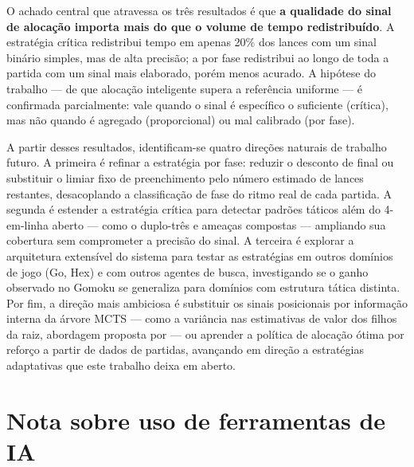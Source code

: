 \documentclass[cic,tc]{iiufrgs}
\begin{document}
O achado central que atravessa os três resultados é que \textbf{a qualidade do sinal de alocação importa mais do que o volume de tempo redistribuído}. A estratégia crítica redistribui tempo em apenas 20\% dos lances com um sinal binário simples, mas de alta precisão; a por fase redistribui ao longo de toda a partida com um sinal mais elaborado, porém menos acurado. A hipótese do trabalho — de que alocação inteligente supera a referência uniforme — é confirmada parcialmente: vale quando o sinal é específico o suficiente (crítica), mas não quando é agregado (proporcional) ou mal calibrado (por fase).

A partir desses resultados, identificam-se quatro direções naturais de trabalho futuro. A primeira é refinar a estratégia por fase: reduzir o desconto de final ou substituir o limiar fixo de preenchimento pelo número estimado de lances restantes, desacoplando a classificação de fase do ritmo real de cada partida. A segunda é estender a estratégia crítica para detectar padrões táticos além do 4-em-linha aberto — como o duplo-três e ameaças compostas — ampliando sua cobertura sem comprometer a precisão do sinal. A terceira é explorar a arquitetura extensível do sistema para testar as estratégias em outros domínios de jogo (Go, Hex) e com outros agentes de busca, investigando se o ganho observado no Gomoku se generaliza para domínios com estrutura tática distinta. Por fim, a direção mais ambiciosa é substituir os sinais posicionais por informação interna da árvore MCTS — como a variância nas estimativas de valor dos filhos da raiz, abordagem proposta por \citet{huang2010time} — ou aprender a política de alocação ótima por reforço a partir de dados de partidas, avançando em direção a estratégias adaptativas que este trabalho deixa em aberto.

% 





\chapter*{Nota sobre uso de ferramentas de IA}
\end{document}
